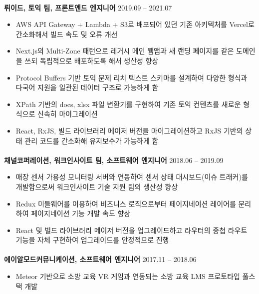 \documentclass{article}
\begin{document}
\paragraph{}
\textbf{뤼이드, 토익 팀, 프론트엔드 엔지니어} \hfill 2019.09 -- 2021.07
\begin{itemize}
    \setlength\itemsep{0.1em}
    \item AWS API Gateway + Lambda + S3로 배포되어 있던 기존 아키텍처를 Vercel로 간소화해서 빌드 속도 및 오류 개선
    \item Next.js의 Multi-Zone 패턴으로 레거시 메인 웹앱과 새 랜딩 페이지를 같은 도메인을 쓰되 독립적으로 배포하도록 해서 생산성 향상
     \item Protocol Buffers 기반 토익 문제 리치 텍스트 스키마를 설계하여 다양한 형식과 다국어 지원을 일관된 데이터 구조로 가능하게 함
     \item XPath 기반의 docs, xlsx 파일 변환기를 구현하여 기존 토익 컨텐츠를 새로운 형식으로 신속히 마이그레이션
     \item React, RxJS, 빌드 라이브러리 메이저 버전을 마이그레이션하고 RxJS 기반의 상태 관리 코드를 간소화해 유지보수가 가능하게 함
\end{itemize}
\paragraph{}
\textbf{채널코퍼레이션, 워크인사이트 팀, 소프트웨어 엔지니어} \hfill 2018.06 -- 2019.09
\begin{itemize}
     \setlength\itemsep{0.1em}
     \item 매장 센서 가용성 모니터링 서버와 연동하여 센서 상태 대시보드(이슈 트래커)를 개발함으로써 워크인사이트 기술 지원 팀의 생산성 향상
     \item Redux 미들웨어를 이용하여 비즈니스 로직으로부터 페이지네이션 레이어를 분리하여 페이지네이션 기능 개발 속도 향상
     \item React 및 빌드 라이브러리 메이저 버전을 업그레이드하고 라우터의 중첩 라우트 기능을 자체 구현하여 업그레이드를 안정적으로 진행
\end{itemize}
\paragraph{}
\textbf{에이알모드커뮤니케이션, 소프트웨어 엔지니어} \hfill 2017.11 -- 2018.06
\begin{itemize}
    \setlength\itemsep{0.1em}
     \item Meteor 기반으로 소방 교육 VR 게임과 연동되는 소방 교육 LMS 프로토타입 풀스택 개발
\end{itemize}
\end{document}
